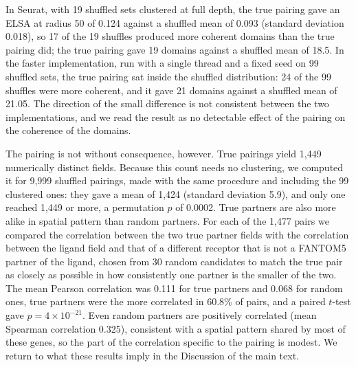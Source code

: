 \documentclass[10pt]{article}
\begin{document}
In Seurat, with 19 shuffled sets clustered at full depth, the true pairing gave an ELSA at radius 50 of 0.124 against a shuffled mean of 0.093 (standard deviation 0.018), so 17 of the 19 shuffles produced more coherent domains than the true pairing did; the true pairing gave 19 domains against a shuffled mean of 18.5. In the faster implementation, run with a single thread and a fixed seed on 99 shuffled sets, the true pairing sat inside the shuffled distribution: 24 of the 99 shuffles were more coherent, and it gave 21 domains against a shuffled mean of 21.05. The direction of the small difference is not consistent between the two implementations, and we read the result as no detectable effect of the pairing on the coherence of the domains.

The pairing is not without consequence, however. True pairings yield 1,449 numerically distinct fields. Because this count needs no clustering, we computed it for 9,999 shuffled pairings, made with the same procedure and including the 99 clustered ones: they gave a mean of 1,424 (standard deviation 5.9), and only one reached 1,449 or more, a permutation $p$ of 0.0002. True partners are also more alike in spatial pattern than random partners. For each of the 1,477 pairs we compared the correlation between the two true partner fields with the correlation between the ligand field and that of a different receptor that is not a FANTOM5 partner of the ligand, chosen from 30 random candidates to match the true pair as closely as possible in how consistently one partner is the smaller of the two. The mean Pearson correlation was 0.111 for true partners and 0.068 for random ones, true partners were the more correlated in 60.8\% of pairs, and a paired $t$-test gave $p = 4 \times 10^{-21}$. Even random partners are positively correlated (mean Spearman correlation 0.325), consistent with a spatial pattern shared by most of these genes, so the part of the correlation specific to the pairing is modest. We return to what these results imply in the Discussion of the main text.



\end{document}
